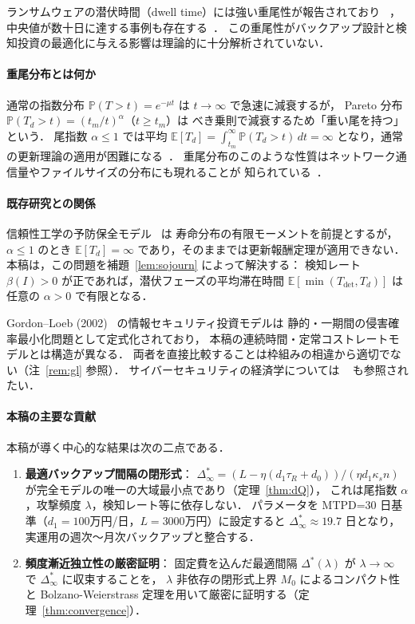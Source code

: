 \documentclass[12pt,a4paper]{article}
\theoremstyle{plain}
\theoremstyle{definition}
\theoremstyle{remark}
\newcommand{\E}{\mathbb{E}}
\newcommand{\Prob}{\mathbb{P}}
\newcommand{\Tdet}{T_{\mathrm{det}}}
\newcommand{\betaI}{\beta(I)}
\newcommand{\Dopt}{\Delta^{*}}
\newcommand{\Dinf}{\Delta^{*}_{\infty}}
\begin{document}
ランサムウェアの潜伏時間（dwell time）には強い重尾性が報告されており
~\cite{mandiant2023,ibm2023,gruber2022,verizon2023,sophos2023,crowdstrike2023}，
中央値が数十日に達する事例も存在する~\cite{ponemon2023}．
この重尾性がバックアップ設計と検知投資の最適化に与える影響は理論的に十分解析されていない．

\paragraph{重尾分布とは何か}
通常の指数分布 $\Prob(T>t)=e^{-\mu t}$ は $t\to\infty$ で急速に減衰するが，
Pareto 分布 $\Prob(T_d>t)=(t_m/t)^\alpha$（$t\ge t_m$）は
べき乗則で減衰するため「重い尾を持つ」という．
尾指数 $\alpha\le1$ では平均 $\E[T_d]=\int_{t_m}^\infty\Prob(T_d>t)\,dt=\infty$
となり，通常の更新理論の適用が困難になる~\cite{feller1971,embrechts1997,resnick2007}．
重尾分布のこのような性質はネットワーク通信量やファイルサイズの分布にも現れることが
知られている~\cite{mitzenmacher2004}．

\paragraph{既存研究との関係}
信頼性工学の予防保全モデル~\cite{barlow1965,nakagawa2005,aven1999} は
寿命分布の有限モーメントを前提とするが，
$\alpha\le1$ のとき $\E[T_d]=\infty$ であり，そのままでは更新報酬定理が適用できない．
本稿は，この問題を補題~\ref{lem:sojourn} によって解決する：
検知レート $\betaI>0$ が正であれば，潜伏フェーズの平均滞在時間 $\E[\min(\Tdet,T_d)]$ は
任意の $\alpha>0$ で有限となる．

Gordon--Loeb (2002)~\cite{gordon2002} の情報セキュリティ投資モデルは
静的・一期間の侵害確率最小化問題として定式化されており，
本稿の連続時間・定常コストレートモデルとは構造が異なる．
両者を直接比較することは枠組みの相違から適切でない（注~\ref{rem:gl} 参照）．
サイバーセキュリティの経済学については
~\cite{gordon2002,hausken2006,laszka2017,anderson2020,fielder2016,moore2009,bohme2010}
も参照されたい．

\paragraph{本稿の主要な貢献}
本稿が導く中心的な結果は次の二点である．
\begin{enumerate}[leftmargin=*]
\item \textbf{最適バックアップ間隔の閉形式}：
  $\Dinf=(L-\eta(d_1\tau_R+d_0))/(\eta d_1\kappa_s n)$
  が完全モデルの唯一の大域最小点であり（定理~\ref{thm:dQ}），
  これは尾指数 $\alpha$，攻撃頻度 $\lambda$，検知レート等に依存しない．
  パラメータを MTPD=30 日基準（$d_1=100$万円/日，$L=3000$万円）に設定すると
  $\Dinf\approx19.7$ 日となり，実運用の週次〜月次バックアップと整合する．
\item \textbf{頻度漸近独立性の厳密証明}：
  固定費を込んだ最適間隔 $\Dopt(\lambda)$ が
  $\lambda\to\infty$ で $\Dinf$ に収束することを，
  $\lambda$ 非依存の閉形式上界 $M_0$ によるコンパクト性と
  Bolzano-Weierstrass 定理を用いて厳密に証明する（定理~\ref{thm:convergence}）．
\end{enumerate}
\end{document}
